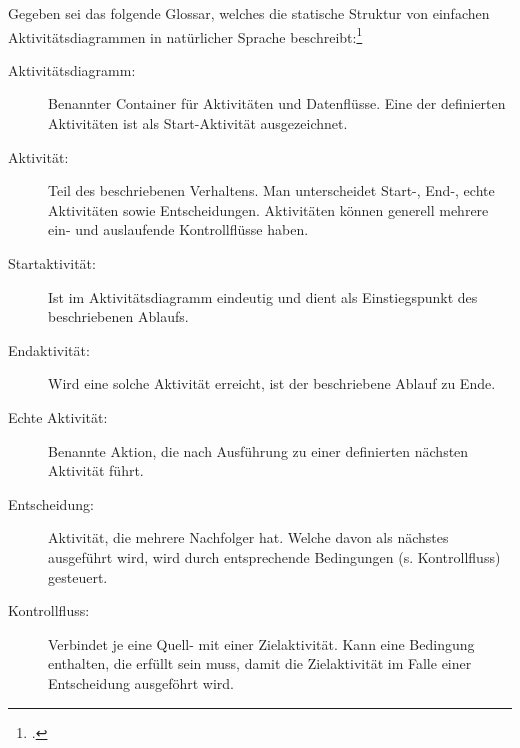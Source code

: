 \documentclass{lehramt-informatik-aufgabe}
\begin{document}

Gegeben sei das folgende Glossar, welches die statische Struktur von
einfachen Aktivitätsdiagrammen in natürlicher
Sprache beschreibt:\footcite[Thema 2 Teilaufgabe 2 Aufgabe 2]{examen:66116:2017:09}

\begin{description}
\item[Aktivitätsdiagramm:]
Benannter Container für Aktivitäten und Datenflüsse. Eine der
definierten Aktivitäten ist als Start-Aktivität ausgezeichnet.

\item[Aktivität:]
Teil des beschriebenen Verhaltens. Man unterscheidet Start-, \mbox{End-,} echte
Aktivitäten sowie Entscheidungen. Aktivitäten können generell mehrere
ein- und auslaufende Kontrollflüsse haben.

\item[Startaktivität:]
Ist im Aktivitätsdiagramm eindeutig und dient als Einstiegspunkt des
beschriebenen Ablaufs.

\item[Endaktivität:]
Wird eine solche Aktivität erreicht, ist der beschriebene Ablauf zu
Ende.

\item[Echte Aktivität:]
Benannte Aktion, die nach Ausführung zu einer definierten nächsten
Aktivität führt.

\item[Entscheidung:]
Aktivität, die mehrere Nachfolger hat. Welche davon als nächstes
ausgeführt wird, wird durch entsprechende Bedingungen (s. Kontrollfluss)
gesteuert.

\item[Kontrollfluss:]
Verbindet je eine Quell- mit einer Zielaktivität. Kann eine Bedingung
enthalten, die erfüllt sein muss, damit die Zielaktivität im Falle einer
Entscheidung ausgeföhrt wird.

\end{description}
\end{document}
